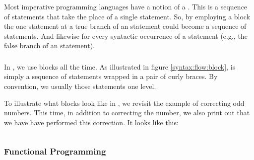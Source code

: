 Most imperative programming languages have a notion of a . This is a sequence of statements that take the place of a single statement. So, by employing a block the one statement at a true branch of an  statement could become a sequence of statements. And likewise for every syntactic occurrence of a statement (e.g., the false branch of an  statement).

\subsubsection{\csharp}

In \csharp, we use blocks all the time. As illustrated in figure \ref{syntax:flow:block}, is simply a sequence of statements wrapped in a pair of curly braces. By convention, we usually  those statements one level.

\begin{syntaxfloat}
  
  \caption{Block statements}
  \label{syntax:flow:block}
\end{syntaxfloat}

To illustrate what blocks look like in \csharp, we revisit the example of correcting odd numbers. This time, in addition to correcting the number, we also print out that we have have performed this correction. It looks like this:

\inputminted[linenos]{csharp}{../src/csharp/flow_branch/ifblock/Program.cs}

\subsubsection{Functional Programming}

